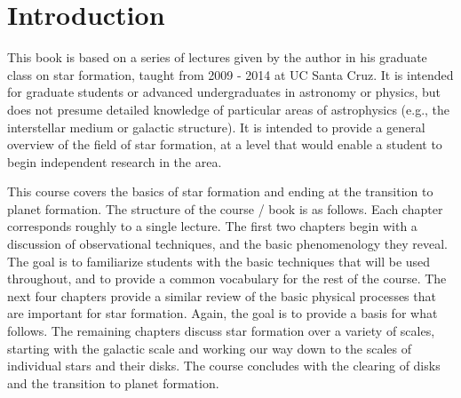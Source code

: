 \documentclass{tex/tufte-book} %
\begin{document}




\cleardoublepage
\chapter*{Introduction} %

This book is based on a series of lectures given by the author in his graduate class on star formation, taught from 2009 - 2014 at UC Santa Cruz. It is intended for graduate students or advanced undergraduates in astronomy or physics, but does not presume detailed knowledge of particular areas of astrophysics (e.g., the interstellar medium or galactic structure). It is intended to provide a general overview of the field of star formation, at a level that would enable a student to begin independent research in the area.

This course covers the basics of star formation and ending at the transition to planet formation. The structure of the course / book is as follows. Each chapter corresponds roughly to a single lecture. The first two chapters begin with a discussion of observational techniques, and the basic phenomenology they reveal. The goal is to familiarize students with the basic techniques that will be used throughout, and to provide a common vocabulary for the rest of the course. The next four chapters provide a similar review of the basic physical processes that are important for star formation. Again, the goal is to provide a basis for what follows. The remaining chapters discuss star formation over a variety of scales, starting with the galactic scale and working our way down to the scales of individual stars and their disks. The course concludes with the clearing of disks and the transition to planet formation.
\end{document}
